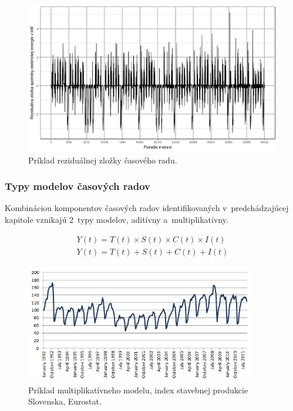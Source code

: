 \documentclass[a4paper,twoside,slovak,12pt,appendix]{article}
\begin{document}
\begin{figure}[H]
  \centering
  \includegraphics[width=\textwidth]{random_component.png}
  \caption{Príklad reziduálnej zložky časového radu.}
  \label{fig:random-component}
\end{figure}

\subsubsection{Typy modelov časových radov}
Kombináciou komponentov časových radov identifikovaných v~predchádzajúcej
kapitole vznikajú 2~typy modelov, aditívny a~multiplikatívny.

\begin{equation}
  \begin{split}
    Y(t) = T(t) \times S(t) \times C(t) \times I(t)
    \\
    Y(t) = T(t) + S(t) + C(t) + I(t)
  \end{split}
  \label{eq:time-series-models}
\end{equation}

\begin{figure}[htbp]
  \centering
	\captionsetup{justification=centering}
  \includegraphics[width=0.9\textwidth]{multi_model.jpg}
  \caption[Príklad multiplikatívneho modelu.]{Príklad multiplikatívneho modelu, index stavebnej produkcie Slovenska, Eurostat.}
  \label{fig:multi-time-series-model}
\end{figure}
\end{document}
